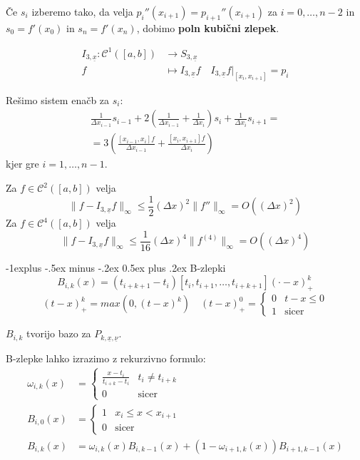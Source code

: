 \documentclass[a3paper,9pt]{extarticle}
\makeatletter
\renewcommand{\subsection}{\@startsection{subsection}{2}{0mm}%
                                {-1explus -.5ex minus -.2ex}%
                                {0.5ex plus .2ex}%
                                {\normalfont\normalsize\bfseries}}
\makeatother
\begin{document}
\begin{multicols}{5}
Če $s_i$ izberemo tako, da velja $p_i''(x_{i+1}) = p_{i+1}''(x_{i+1})$ za $i = 0, \dots, n-2$ in $s_0 = f'(x_0)$ in $s_n = f'(x_n)$, dobimo \textbf{poln kubični zlepek}.

\begin{align*}
	I_{3, \underline{x}} : \mathcal{C}^1([a,b]) &\to S_{3, \underline{x}} \\
	f &\mapsto I_{3, \underline{x}} f \quad I_{3, \underline{x}} f|_{[x_i, x_{i+1}]} = p_i
\end{align*}

Rešimo sistem enačb za $s_i$:
\begin{multline*}
	\frac{1}{\Delta x_{i-1}} s_{i-1} + 2\left(\frac{1}{\Delta x_{i-1}} + \frac{1}{\Delta x_i}\right) s_i + \frac{1}{\Delta x_i} s_{i+1} = \\
		= 3\left(\frac{[x_{i-1}, x_i]f}{\Delta x_{i-1}} + \frac{[x_i, x_{i+1}]f}{\Delta x_i}\right) 
\end{multline*}
kjer gre $i = 1, \dots, n-1$.

Za $f \in \mathcal{C}^2([a,b])$ velja
\[ \| f - I_{3, \underline{x}} f \|_\infty \leq \frac{1}{2}(\Delta x)^2 \| f'' \|_\infty = O((\Delta x)^2)\]
Za $f \in \mathcal{C}^4([a,b])$ velja
\[ \| f - I_{3, \underline{x}} f \|_\infty \leq \frac{1}{16}(\Delta x)^4 \| f^{(4)} \|_\infty = O((\Delta x)^4)\]

\subsection{B-zlepki}
\[B_{i,k}(x) = (t_{i+k+1} - t_i)[t_i, t_{i+1}, \dots, t_{i+k+1}]( \cdotp - x)_+^k\]
\[ (t-x)_+^k = max(0, (t-x)^k) \quad (t-x)_+^0 = \begin{cases}
	0 & t - x \leq 0 \\
	1 & \text{sicer}
\end{cases}\]

$B_{i,k}$ tvorijo bazo za $P_{k, \underline{x}, \underline{\nu}}$.

B-zlepke lahko izrazimo z rekurzivno formulo:
\begin{align*}
	\omega_{i,k}(x) &= \begin{cases}
		\frac{x-t_i}{t_{i+k} - t_i} & t_i \neq t_{i+k} \\
		0 & \text{sicer}
	\end{cases} \\
	B_{i,0}(x) &= \begin{cases}
		1 & x_i \leq x < x_{i+1} \\
		0 & \text{sicer}
	\end{cases} \\
	B_{i,k}(x) &= \omega_{i, k}(x) B_{i,k-1}(x) + (1-\omega_{i+1, k}(x)) B_{i+1,k-1}(x)
\end{align*}


\end{multicols}
\end{document}
